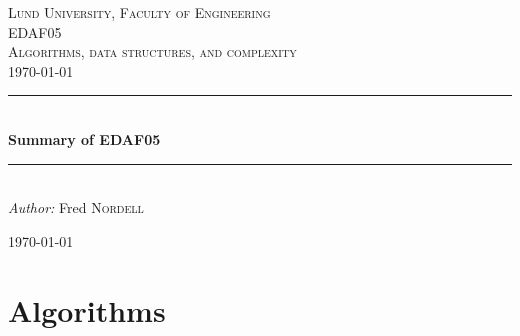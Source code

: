\documentclass[12pt]{article} %
\begin{document}

\begin{titlepage}

\newcommand{\HRule}{\rule{\linewidth}{0.5mm}} %

\center %

\textsc{\LARGE Lund University, Faculty of Engineering}\\[1.5cm] %
\textsc{\Large EDAF05}\\[0.5cm] %
\textsc{\large Algorithms, data structures, and complexity}\\[0.5cm] %
{\large \today}\\[3cm] %

\HRule \\[1cm]
{ \huge \bfseries Summary of EDAF05}\\[0.4cm] %
\HRule \\[1.5cm]

\emph{Author:} Fred \textsc{Nordell} %

{\large \today}\\[3cm] %


\vfill %

\end{titlepage}


\tableofcontents %
\lstlistoflistings %

\newpage %


\section{Algorithms} %
\end{document}
